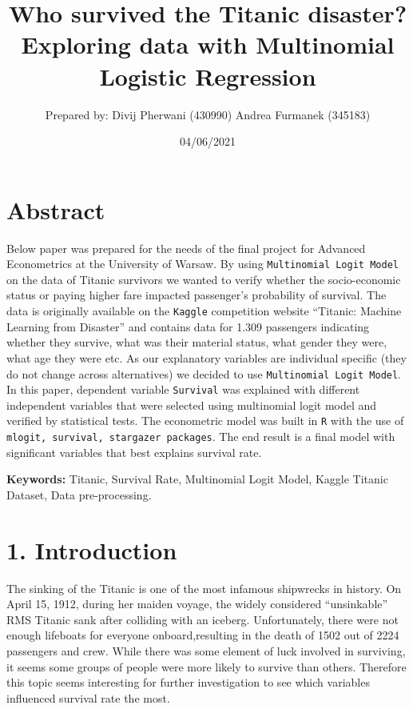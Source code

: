 \documentclass[
]{article}
\title{Who survived the Titanic disaster? Exploring data with Multinomial
Logistic Regression}
\author{Prepared by: Divij Pherwani (430990) Andrea Furmanek (345183)}
\date{04/06/2021}
\begin{document}
\maketitle

\hypertarget{abstract}{%
\section{Abstract}\label{abstract}}

Below paper was prepared for the needs of the final project for Advanced
Econometrics at the University of Warsaw. By using
\texttt{Multinomial\ Logit\ Model} on the data of Titanic survivors we
wanted to verify whether the socio-economic status or paying higher fare
impacted passenger's probability of survival. The data is originally
available on the \texttt{Kaggle} competition website ``Titanic: Machine
Learning from Disaster'' and contains data for 1.309 passengers
indicating whether they survive, what was their material status, what
gender they were, what age they were etc. As our explanatory variables
are individual specific (they do not change across alternatives) we
decided to use \texttt{Multinomial\ Logit\ Model}. In this paper,
dependent variable \texttt{Survival} was explained with different
independent variables that were selected using multinomial logit model
and verified by statistical tests. The econometric model was built in
\texttt{R} with the use of
\texttt{mlogit,\ survival,\ stargazer\ packages}. The end result is a
final model with significant variables that best explains survival rate.

\textbf{Keywords:} Titanic, Survival Rate, Multinomial Logit Model,
Kaggle Titanic Dataset, Data pre-processing.

\hypertarget{introduction}{%
\section{1. Introduction}\label{introduction}}

The sinking of the Titanic is one of the most infamous shipwrecks in
history. On April 15, 1912, during her maiden voyage, the widely
considered ``unsinkable'' RMS Titanic sank after colliding with an
iceberg. Unfortunately, there were not enough lifeboats for everyone
onboard,resulting in the death of 1502 out of 2224 passengers and crew.
While there was some element of luck involved in surviving, it seems
some groups of people were more likely to survive than others. Therefore
this topic seems interesting for further investigation to see which
variables influenced survival rate the most.
\end{document}
